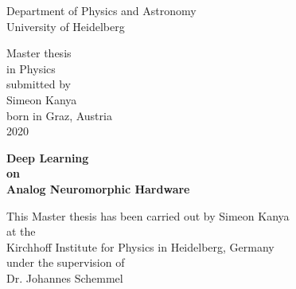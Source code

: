 \begin{titlepage}
	
	
	\thispagestyle{empty}
	\begin{center}
		\renewcommand{\baselinestretch}{2.00}
		\Large\sffamily
		Department of Physics and Astronomy\\
		\large University of Heidelberg
		\par\vfill\normalfont
		Master thesis\\
		in Physics\\
		submitted by\\
		Simeon Kanya\\
		born in Graz, Austria\\
		2020
	\end{center}
	\newpage
	
	\thispagestyle{empty}
	\begin{center}
		\renewcommand{\baselinestretch}{2.00}
		\Large\bfseries\sffamily
		Deep Learning  \\
		on\\
		Analog Neuromorphic Hardware
		\par
		\vfill
		\large\normalfont
		This Master thesis has been carried out by Simeon Kanya\\
		at the\\
		Kirchhoff Institute for Physics in Heidelberg, Germany\\
		under the supervision of\\
		Dr. Johannes Schemmel
	\end{center}\par
	\vspace{5\baselineskip}
	
	\renewcommand{\baselinestretch}{1.00}\normalsize
\end{titlepage}


